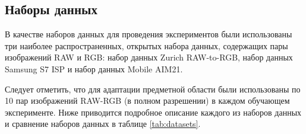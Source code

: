 \subsection{Наборы данных}\label{sect-5-2}

В качестве наборов данных для проведения экспериментов были использованы три наиболее распространенных, открытых набора данных, содержащих пары изображений RAW и RGB: набор данных Zurich RAW-to-RGB, набор данных Samsung S7 ISP и набор данных Mobile AIM21.

Следует отметить, что для адаптации предметной области были использованы по 10 пар изображений RAW-RGB (в полном разрешении) в каждом обучающем эксперименте. Ниже приводится подробное описание каждого из наборов данных и сравнение наборов данных в таблице \ref{tab:datasets}.





